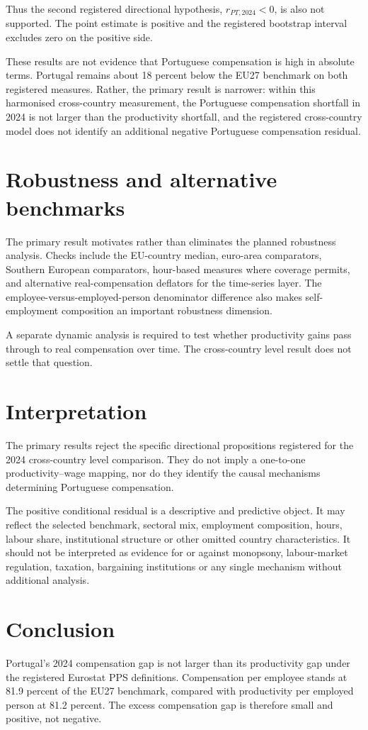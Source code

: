\documentclass[11pt,a4paper]{article}
\begin{document}
Thus the second registered directional hypothesis, $r_{PT,2024}<0$, is also not supported. The point estimate is positive and the registered bootstrap interval excludes zero on the positive side.

These results are not evidence that Portuguese compensation is high in absolute terms. Portugal remains about 18 percent below the EU27 benchmark on both registered measures. Rather, the primary result is narrower: within this harmonised cross-country measurement, the Portuguese compensation shortfall in 2024 is not larger than the productivity shortfall, and the registered cross-country model does not identify an additional negative Portuguese compensation residual.

\section{Robustness and alternative benchmarks}
The primary result motivates rather than eliminates the planned robustness analysis. Checks include the EU-country median, euro-area comparators, Southern European comparators, hour-based measures where coverage permits, and alternative real-compensation deflators for the time-series layer. The employee-versus-employed-person denominator difference also makes self-employment composition an important robustness dimension.

A separate dynamic analysis is required to test whether productivity gains pass through to real compensation over time. The cross-country level result does not settle that question.

\section{Interpretation}
The primary results reject the specific directional propositions registered for the 2024 cross-country level comparison. They do not imply a one-to-one productivity--wage mapping, nor do they identify the causal mechanisms determining Portuguese compensation.

The positive conditional residual is a descriptive and predictive object. It may reflect the selected benchmark, sectoral mix, employment composition, hours, labour share, institutional structure or other omitted country characteristics. It should not be interpreted as evidence for or against monopsony, labour-market regulation, taxation, bargaining institutions or any single mechanism without additional analysis.

\section{Conclusion}
Portugal's 2024 compensation gap is not larger than its productivity gap under the registered Eurostat PPS definitions. Compensation per employee stands at 81.9 percent of the EU27 benchmark, compared with productivity per employed person at 81.2 percent. The excess compensation gap is therefore small and positive, not negative.
\end{document}
